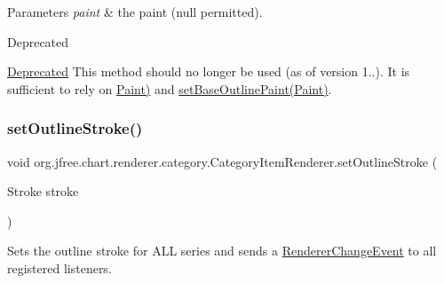 \begin{DoxyParams}{Parameters}
{\em paint} & the paint ({\ttfamily null} permitted).\\
\hline
\end{DoxyParams}
\begin{DoxyRefDesc}{Deprecated}
\item[\mbox{\hyperlink{deprecated__deprecated000160}{Deprecated}}]This method should no longer be used (as of version 1..). It is sufficient to rely on \mbox{\hyperlink{}{Paint)}} and \mbox{\hyperlink{interfaceorg_1_1jfree_1_1chart_1_1renderer_1_1category_1_1_category_item_renderer_a93943e70bb3fe40e631bcc25ac9201d7}{set\+Base\+Outline\+Paint(\+Paint)}}. \end{DoxyRefDesc}
\mbox{\label{interfaceorg_1_1jfree_1_1chart_1_1renderer_1_1category_1_1_category_item_renderer_a7cfc859cf23ca978b2266a2d34650148}} 
\subsubsection{\texorpdfstring{set\+Outline\+Stroke()}{setOutlineStroke()}}
{\footnotesize\ttfamily void org.\+jfree.\+chart.\+renderer.\+category.\+Category\+Item\+Renderer.\+set\+Outline\+Stroke (\begin{DoxyParamCaption}\item[{Stroke}]{stroke }\end{DoxyParamCaption})}

Sets the outline stroke for A\+LL series and sends a \mbox{\hyperlink{}{Renderer\+Change\+Event}} to all registered listeners.


